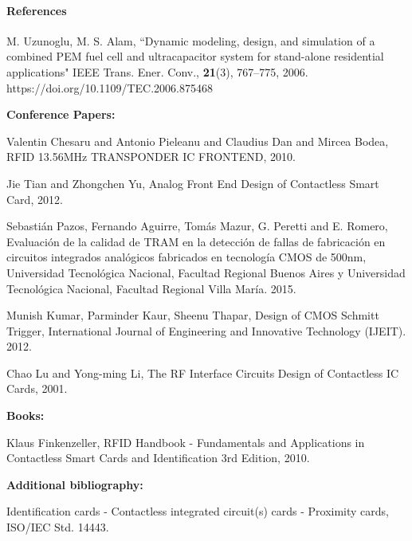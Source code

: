 \documentclass{article} %
\begin{document}
\begin{multicols}{2}
\paragraph{References}

\newline

\footnotesize{

 
\begin{thebibliography}{99}
	M. Uzunoglu, M. S. Alam, ``Dynamic modeling, design, and simulation of a combined PEM fuel cell and ultracapacitor system for stand-alone residential applications" IEEE Trans. Ener. Conv., \textbf{21}(3), 767--775, 2006. https://doi.org/10.1109/TEC.2006.875468


\hspace{-1cm} \textbf{Conference Papers:}

	Valentin Chesaru and Antonio Pieleanu and Claudius Dan and Mircea Bodea, RFID 13.56MHz TRANSPONDER IC FRONTEND, 2010.

	Jie Tian and Zhongchen Yu, Analog Front End Design of Contactless Smart Card, 2012.

	Sebastián Pazos, Fernando Aguirre, Tomás Mazur, G. Peretti and E. Romero, Evaluación de la calidad de TRAM en la detección de fallas de fabricación en circuitos integrados analógicos fabricados en tecnología CMOS de 500nm, Universidad Tecnológica Nacional, Facultad Regional Buenos Aires y Universidad Tecnológica Nacional, Facultad Regional Villa María. 2015.

	Munish Kumar, Parminder Kaur, Sheenu Thapar, Design of CMOS Schmitt Trigger, International Journal of Engineering and Innovative Technology (IJEIT). 2012.

	Chao Lu and Yong-ming Li, The RF Interface Circuits Design of Contactless IC Cards, 2001.

\hspace{-1cm} \textbf{Books:}

	Klaus Finkenzeller, RFID Handbook - Fundamentals and Applications in Contactless Smart Cards and Identification 3rd Edition, 2010.

\hspace{-1cm} \textbf{Additional bibliography:}

	Identification cards - Contactless integrated circuit(s) cards - Proximity cards, ISO/IEC Std. 14443.


\end{thebibliography}}
\end{multicols}
\end{document}
